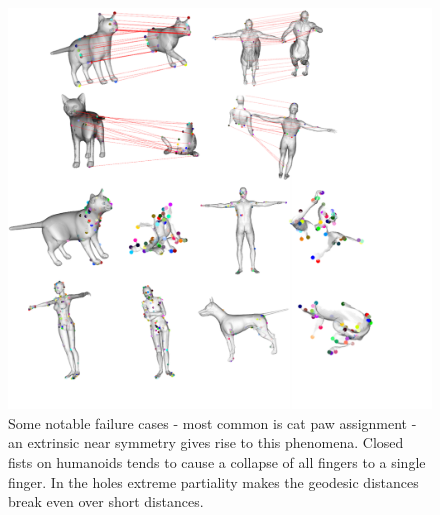\documentclass[10pt,twocolumn,letterpaper]{article}
\begin{document}
\begin{figure}[htb]
	\centering
	\includegraphics[width=1\textwidth]{figures/fail2.png}
	\caption{Some notable failure cases - most common is cat paw assignment - an extrinsic near symmetry gives rise to this phenomena. Closed fists on humanoids tends to cause a collapse of all fingers to a single finger. In the holes extreme partiality makes the geodesic distances break even over short distances.}
\end{figure}
{\small
	
	
}
\end{document}
